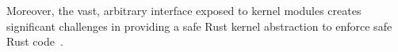 Moreover, the vast, arbitrary interface exposed to kernel modules creates
    significant challenges in providing a safe Rust kernel
    abstraction to enforce safe Rust code~\cite{Miller-hotos19,rust-module-dev-quit-lwn}.


